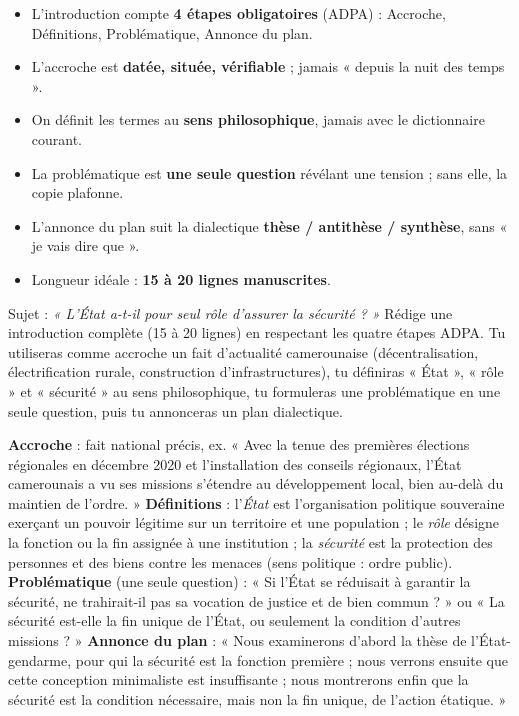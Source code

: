 \documentclass[11pt]{article}
\begin{document}
\begin{aretenir}
\begin{itemize}
\item L'introduction compte \textbf{4 étapes obligatoires} (ADPA) : Accroche, Définitions, Problématique, Annonce du plan.
\item L'accroche est \textbf{datée, située, vérifiable} ; jamais « depuis la nuit des temps ».
\item On définit les termes au \textbf{sens philosophique}, jamais avec le dictionnaire courant.
\item La problématique est \textbf{une seule question} révélant une tension ; sans elle, la copie plafonne.
\item L'annonce du plan suit la dialectique \textbf{thèse / antithèse / synthèse}, sans « je vais dire que ».
\item Longueur idéale : \textbf{15 à 20 lignes manuscrites}.
\end{itemize}
\end{aretenir}

\begin{exercice}
Sujet : \emph{« L'État a-t-il pour seul rôle d'assurer la sécurité ? »} Rédige une introduction complète (15 à 20 lignes) en respectant les quatre étapes ADPA. Tu utiliseras comme accroche un fait d'actualité camerounaise (décentralisation, électrification rurale, construction d'infrastructures), tu définiras « État », « rôle » et « sécurité » au sens philosophique, tu formuleras une problématique en une seule question, puis tu annonceras un plan dialectique.
\end{exercice}

\begin{corrige}
\textbf{Accroche} : fait national précis, ex. « Avec la tenue des premières élections régionales en décembre 2020 et l'installation des conseils régionaux, l'État camerounais a vu ses missions s'étendre au développement local, bien au-delà du maintien de l'ordre. »
\textbf{Définitions} : l'\emph{État} est l'organisation politique souveraine exerçant un pouvoir légitime sur un territoire et une population ; le \emph{rôle} désigne la fonction ou la fin assignée à une institution ; la \emph{sécurité} est la protection des personnes et des biens contre les menaces (sens politique : ordre public).
\textbf{Problématique} (une seule question) : « Si l'État se réduisait à garantir la sécurité, ne trahirait-il pas sa vocation de justice et de bien commun ? » ou « La sécurité est-elle la fin unique de l'État, ou seulement la condition d'autres missions ? »
\textbf{Annonce du plan} : « Nous examinerons d'abord la thèse de l'État-gendarme, pour qui la sécurité est la fonction première ; nous verrons ensuite que cette conception minimaliste est insuffisante ; nous montrerons enfin que la sécurité est la condition nécessaire, mais non la fin unique, de l'action étatique. »
\end{corrige}
\end{document}
